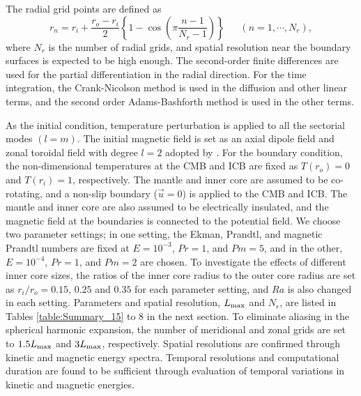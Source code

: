 The radial grid points are defined as
%
\begin{equation}
r_n = r_i + \frac{r_o - r_i}{2} \left\{ 1 - \cos \left( \pi \frac{n-1}{N_r-1} \right) \right\} ~~\;\;\;\; (n = 1, \cdots , N_r) ,
\label{eq:def_of_rn}
\end{equation}
%
where $N_r$ is the number of radial grids, and spatial resolution near the boundary surfaces is expected to be high enough.
The second-order finite differences are used for the partial differentiation in the radial direction.
For the time integration, the Crank-Nicolson method is used in the diffusion and other linear terms, and the second order Adams-Bashforth method is used in the other terms.

As the initial condition, temperature perturbation is applied to all the sectorial modes $(l = m)$. 
The initial magnetic field is set as an axial dipole field and zonal toroidal field with degree $l=2$ adopted by \citet{Uli:2001}. 
For the boundary condition, the non-dimensional temperatures at the CMB and ICB are fixed as $T(r_{o}) = 0$ and  $T(r_{i}) = 1$, respectively. 
The mantle and inner core are assumed to be co-rotating, and a non-slip boundary ($\vec{u} = 0$) is applied to the CMB and ICB. 
The mantle and inner core are also assumed to be electrically insulated, and the magnetic field at the boundaries is connected to the potential field.
We choose two parameter settings; %
in one setting, the Ekman, Prandtl, and magnetic Prandtl numbers are fixed at $E = 10^{-3}$, $Pr = 1$, and $Pm = 5$, and in the other, $E = 10^{-4}$, $Pr = 1$, and $Pm = 2$ are chosen. 
To investigate the effects of different inner core sizes, the ratios of the inner core radius to the outer core radius are set as $r_{i} / r_{o} = 0.15$, $0.25$ and $0.35$ for each parameter setting, and $Ra$ is also changed in each setting. 
Parameters and spatial resolution, $L_{\rm max}$ and $N_{r}$, are listed in Tables \ref{table:Summary_15} to 8 
in the next section. 
To eliminate aliasing in the spherical harmonic expansion, the number of meridional and zonal grids are set to $1.5 L_{\rm max}$ and $3 L_{\rm max}$, respectively.
%
Spatial resolutions are confirmed through kinetic and magnetic energy spectra.
Temporal resolutions and computational duration are found to be sufficient through evaluation of temporal variations in kinetic and magnetic energies.
